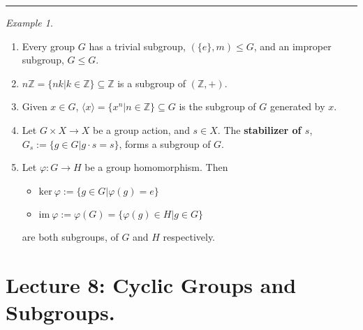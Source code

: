 \documentclass{article}
\theoremstyle{definition}
\theoremstyle{remark}
\newtheorem*{example}{Example}
\begin{document}
\hrule
\vspace{2mm}
\begin{example}~
\begin{enumerate}
\item Every group $G$ has a trivial subgroup, $(\lbrace e\rbrace,m)\leq G$, and an improper subgroup, $G\leq G$.
\item $n\mathbb{Z}=\lbrace nk|k\in\mathbb{Z}\rbrace\subseteq \mathbb{Z}$ is a subgroup of $(\mathbb{Z},+)$.
\item Given $x\in G$, $\langle x\rangle=\lbrace x^n|n\in \mathbb{Z}\rbrace\subseteq G$ is the subgroup of $G$ generated by $x$.
\item Let $G\times X\rightarrow X$ be a group action, and $s\in X$. The \textbf{stabilizer of $s$}, $G_s:=\lbrace g\in G|g\cdot s=s\rbrace$, forms a subgroup of $G$.
\item Let $\varphi:G\rightarrow H$ be a group homomorphism. Then
\begin{itemize}
\item $\mathrm{ker }~\varphi:=\lbrace g\in G | \varphi(g)=e\rbrace$
\item $\mathrm{im }~\varphi:=\varphi(G)=\lbrace \varphi(g)\in H | g\in G\rbrace$
\end{itemize}
are both subgroups, of $G$ and $H$ respectively.
\end{enumerate}
\end{example}
\newpage
\section{Lecture 8: Cyclic Groups and Subgroups.}
\end{document}
